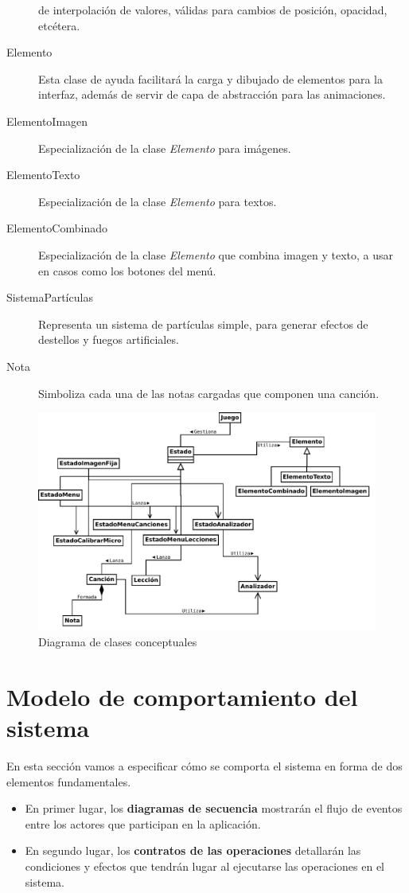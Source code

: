 \begin{description}
  de interpolación de valores, válidas para cambios de posición, opacidad,
  etcétera.
\item[Elemento] Esta clase de ayuda facilitará la carga y dibujado de elementos
  para la interfaz, además de servir de capa de abstracción para las
  animaciones.
\item[ElementoImagen] Especialización de la clase \textit{Elemento} para
  imágenes.
\item[ElementoTexto] Especialización de la clase \textit{Elemento} para textos.
\item[ElementoCombinado] Especialización de la clase \textit{Elemento} que
  combina imagen y texto, a usar en casos como los botones del menú.
\item[SistemaPartículas] Representa un sistema de partículas simple, para
  generar efectos de destellos y fuegos artificiales.
\item[Nota] Simboliza cada una de las notas cargadas que componen una canción.
\end{description}

\begin{figure}[htp!]
  \centering
  \includegraphics[angle=90]{4_analisis/imagen_diagrama_clases_conceptuales}
  \caption{Diagrama de clases conceptuales}
\end{figure}

\pagebreak

\section{Modelo de comportamiento del sistema}
En esta sección vamos a especificar cómo se comporta el sistema en forma de dos
elementos fundamentales.
\begin{itemize}
\item En primer lugar, los \textbf{diagramas de secuencia} mostrarán el flujo de
  eventos entre los actores que participan en la aplicación.
\item En segundo lugar, los \textbf{contratos de las operaciones} detallarán las
  condiciones y efectos que tendrán lugar al ejecutarse las operaciones en el
  sistema.
\end{itemize}

